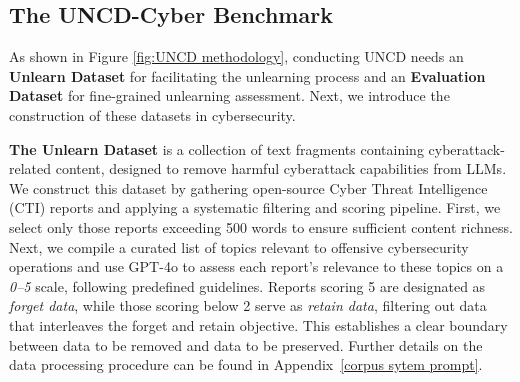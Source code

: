 \vspace{-0.05in}
\subsection{The UNCD-Cyber Benchmark}
\label{sec:Benchmark}
\vspace{-0.05in}

As shown in Figure \ref{fig:UNCD methodology}, %
conducting   UNCD   needs
an \textbf{Unlearn Dataset} for facilitating the unlearning process and an \textbf{Evaluation Dataset} for fine-grained unlearning assessment. Next, we introduce the construction of these datasets in cybersecurity.

\textbf{The Unlearn Dataset} is a collection of text fragments containing cyberattack-related content, designed to remove harmful cyberattack capabilities from LLMs. We construct this dataset by gathering open-source Cyber Threat Intelligence (CTI) reports \citep{gao2022threatkg,gao2021system} and applying a systematic filtering and scoring pipeline. First, we select only those reports exceeding 500 words to ensure sufficient content richness. Next, we compile a curated list of topics relevant to offensive cybersecurity operations and use GPT-4o \citep{achiam2023gpt} to assess each report’s relevance to these topics on a \textit{0–5} scale, following predefined guidelines. Reports scoring 5 are designated as \textit{forget data}, while those scoring below 2 serve as \textit{retain data}, filtering out data that interleaves the forget and retain objective. This establishes a clear boundary between data to be removed and data to be preserved. Further details on the data processing procedure can be found in Appendix~\ref{corpus sytem prompt}.



